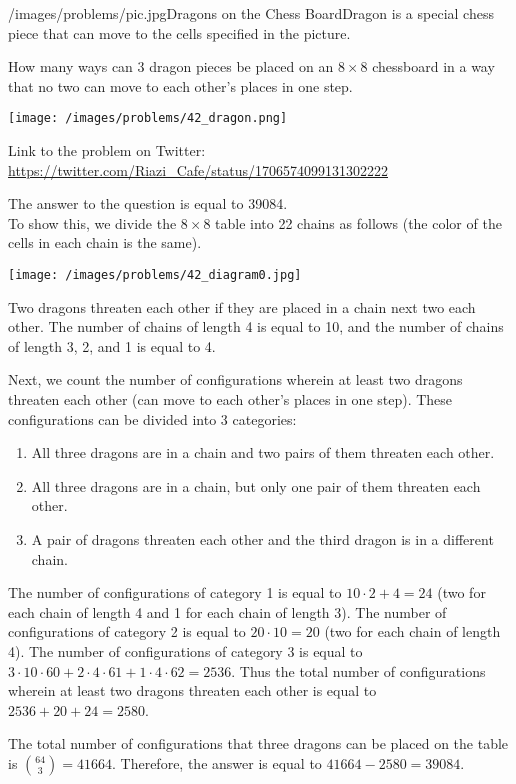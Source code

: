 \begin{problem}{/images/problems/pic.jpg}{Dragons on the Chess Board}Dragon is a special chess piece that can move to the cells specified in the picture.

How many ways can 3 dragon pieces be placed on an $8\times8$ chessboard in a way that no two can move to each other's places in one step.

\begin{center}
	\texttt{[image: /images/problems/42\_dragon.png]}
\end{center}


Link to the problem on Twitter:  \url{https://twitter.com/Riazi_Cafe/status/1706574099131302222}\end{problem}
\begin{solution}
The answer to the question is equal to 39084.\\[0.2cm]

To show this, we divide the $8 \times 8$ table into 22 chains as follows (the color of the cells in each chain is the same).

\begin{center}
	\texttt{[image: /images/problems/42\_diagram0.jpg]}
\end{center}

Two dragons threaten each other if they are placed in a chain next two each other.
The number of chains of length 4 is equal to 10, and the number of chains of length 3, 2, and 1 is equal to 4.

Next, we count the number of configurations wherein at least two dragons threaten each other (can move to each other's places in one step). These configurations can be divided into 3 categories:

\begin{enumerate}
\item All three dragons are in a chain and two pairs of them threaten each other.
\item All three dragons are in a chain, but only one pair of them threaten each other.
\item A pair of dragons threaten each other and the third dragon is in a different chain.
\end{enumerate}

The number of configurations of category 1 is equal to $10 \cdot 2 + 4 = 24$ (two for each chain of length 4 and 1 for each chain of length 3).
The number of configurations of category 2 is equal to $20 \cdot 10 = 20$ (two for each chain of length 4).
The number of configurations of category 3 is equal to $3 \cdot 10 \cdot 60 + 2 \cdot 4 \cdot 61 + 1 \cdot 4 \cdot 62 = 2536$.
Thus the total number of configurations wherein at least two dragons threaten each other is equal to $2536 + 20 + 24 = 2580$.

The total number of configurations that three dragons can be placed on the table is $\binom{64}{3} = 41664$.
Therefore, the answer is equal to $41664 - 2580 = 39084$.
\end{solution}
